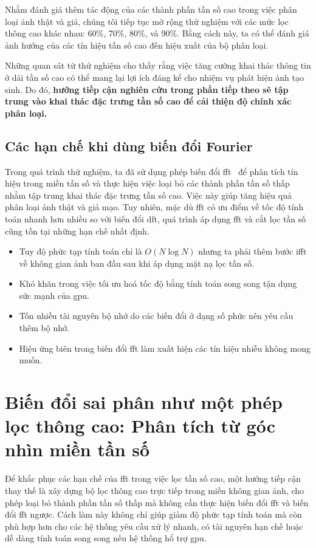 Nhằm đánh giá thêm tác động của các thành phần tần số cao trong việc phân loại ảnh thật và giả, chúng tôi tiếp tục mở rộng thử nghiệm với các mức lọc thông cao khác nhau: 60\%, 70\%, 80\%, và 90\%. Bằng cách này, ta có thể đánh giá ảnh hưởng của các tín hiệu tần số cao đến hiệu xuất của bộ phân loại.

Những quan sát từ thử nghiệm cho thấy rằng việc tăng cường khai thác thông tin ở dải tần số cao có thể mang lại lợi ích đáng kể cho nhiệm vụ phát hiện ảnh tạo sinh. Do đó, \textbf{hướng tiếp cận nghiên cứu trong phần tiếp theo sẽ tập trung vào khai thác đặc trưng tần số cao để cải thiện độ chính xác phân loại.}

\subsection{Các hạn chế khi dùng biến đổi Fourier}

Trong quá trình thử nghiệm, ta đã sử dụng phép biến đổi \gls{fft}~\cite{Arunachalam2013TheFF} để phân tích tín hiệu trong miền tần số và thực hiện việc loại bỏ các thành phần tần số thấp nhằm tập trung khai thác đặc trưng tần số cao. Việc này giúp tăng hiệu quả phân loại ảnh thật và giả mạo. Tuy nhiên, mặc dù \gls{fft} có ưu điểm về tốc độ tính toán nhanh hơn nhiều so với biến đổi \gls{dft}, quá trình áp dụng \gls{fft} và cắt lọc tần số cũng tồn tại những hạn chế nhất định.

\begin{itemize}
	\item Tuy độ phức tạp tính toán chỉ là $O(N\log{N})$ nhưng ta phải thêm bước \gls{ifft} về không gian ảnh ban đầu sau khi áp dụng mặt nạ lọc tần số.
	\item Khó khăn trong việc tối ưu hoá tốc độ bằng tính toán song song tận dụng sức mạnh của \gls{gpu}.
	\item Tốn nhiều tài nguyên bộ nhớ do các biến đổi ở dạng số phức nên yêu cầu thêm bộ nhớ.
	\item Hiệu ứng biên trong biến đổi \gls{fft} làm xuất hiện các tín hiệu nhiễu không mong muốn.
\end{itemize}

\section{Biến đổi sai phân như một phép lọc thông cao: Phân tích từ góc nhìn miền tần số}

Để khắc phục các hạn chế của \gls{fft} trong việc lọc tần số cao, một hướng tiếp cận thay thế là xây dựng bộ lọc thông cao trực tiếp trong miền không gian ảnh, cho phép loại bỏ thành phần tần số thấp mà không cần thực hiện biến đổi \gls{fft} và biến đổi \gls{fft} ngược.
%
Cách làm này không chỉ giúp giảm độ phức tạp tính toán mà còn phù hợp hơn cho các hệ thống yêu cầu xử lý nhanh, có tài nguyên hạn chế hoặc dễ dàng tính toán song song nếu hệ thống hổ trợ \gls{gpu}.

